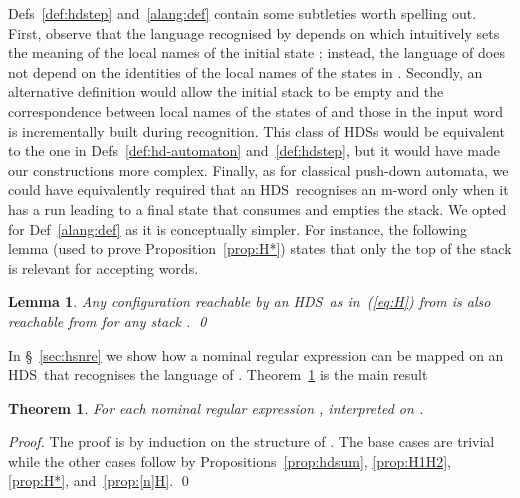 \documentclass[runningheads,a4paper]{llncs}
\newcommand{\longversion}[1]{#1}
\newcommand{\hdns}{HDS}
\newtheorem{theorem}{Theorem}[section]
\newtheorem{lemma}{Theorem}[section]
\newtheorem{theorem}{Theorem}[section]
\newtheorem{lemma}{Lemma}[section]
\begin{document}
Defs~\ref{def:hdstep} and~\ref{alang:def} contain some
subtleties worth spelling out.
First, observe that the language recognised by  depends on
 which intuitively sets the meaning of the local names of the
initial state ; instead, the language of  does not
depend on the identities of the local names of the states in .
Secondly, an alternative definition would allow the initial stack to
be empty and the correspondence between local names of the states of
 and those in the input word is incrementally built during
recognition.
This class of \hdns s would be equivalent to the one in
Defs~\ref{def:hd-automaton} and~\ref{def:hdstep}, but it would have
made our constructions more complex.
Finally, as for classical push-down automata, we could have
equivalently required that an \hdns\ recognises an m-word  only
when it has a run leading to a final state that consumes  and
empties the stack.
We opted for Def~\ref{alang:def} as it is conceptually simpler.
For instance, the following lemma (used to prove
Proposition~\ref{prop:H*}) states that only the top of the stack
is relevant for accepting words.
\begin{lemma}\label{lemma:top}
  Any configuration reachable by an \hdns\ as in~(\ref{eq:H}) from
   is also reachable from
   for any stack .
\qed
\end{lemma}

In \S~\ref{sec:hsnre} we show how a nominal regular expression  can
be mapped on an \hdns\  that recognises the language of
.
Theorem~\ref{thm:hdnsnre} is the main result
\begin{theorem}\label{thm:hdnsnre}
  For each nominal regular expression , 
  interpreted on .
\end{theorem}
\longversion{
  \begin{proof}
   The proof is by induction on the structure of .
The base cases are trivial while the other cases follow by
   Propositions~\ref{prop:hdsum}, \ref{prop:H1H2}, \ref{prop:H*},
   and~\ref{prop:[n]H}.
\qed
 \end{proof}
}
\end{document}
